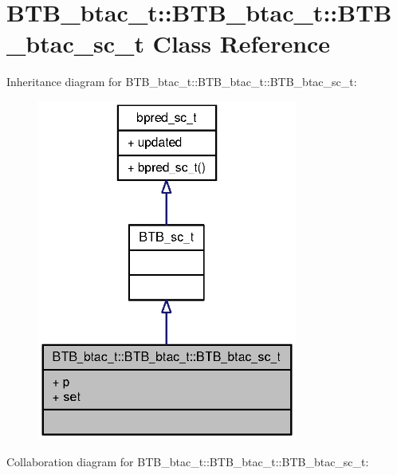 \section{BTB\_\-btac\_\-t::BTB\_\-btac\_\-t::BTB\_\-btac\_\-sc\_\-t Class Reference}
\label{classBTB__btac__t_1_1BTB__btac__sc__t}
Inheritance diagram for BTB\_\-btac\_\-t::BTB\_\-btac\_\-t::BTB\_\-btac\_\-sc\_\-t:\nopagebreak
\begin{figure}[H]
\begin{center}
\leavevmode
\includegraphics[width=242pt]{classBTB__btac__t_1_1BTB__btac__sc__t__inherit__graph}
\end{center}
\end{figure}
Collaboration diagram for BTB\_\-btac\_\-t::BTB\_\-btac\_\-t::BTB\_\-btac\_\-sc\_\-t:\nopagebreak
